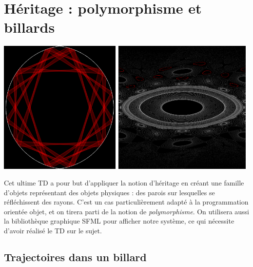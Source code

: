 \documentclass{book}
\begin{document}
\setcounter{chapter}{4}

\chapter{Héritage : polymorphisme et billards}

\begin{center}
  \includegraphics[height=18em]{TD5/exemple-billard.png}
  \hspace{3em}
  \includegraphics[height=18em]{TD5/exemple-espace-des-phases.png}
\end{center}

Cet ultime TD a pour but d'appliquer la notion d'héritage en créant une famille d'objets représentant des objets physiques : des parois sur lesquelles se réfléchissent des rayons. C'est un cas particulièrement adapté à la programmation orientée objet, et on tirera parti de la notion de \emph{polymorphisme}. On utilisera aussi la bibliothèque graphique SFML pour afficher notre système, ce qui nécessite d'avoir réalisé le TD sur le sujet.

\section{Trajectoires dans un billard}
\end{document}
